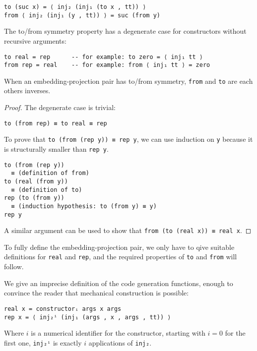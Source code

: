 \begin{verbatim}
to (suc x) = ⟨ inj₂ (inj₁ (to x , tt)) ⟩
from ⟨ inj₂ (inj₁ (y , tt)) ⟩ = suc (from y)
\end{verbatim}

The to/from symmetry property has a degenerate case for constructors
without recursive arguments:

\begin{verbatim}
to real = rep      -- for example: to zero = ⟨ inj₁ tt ⟩
from rep = real    -- for example: from ⟨ inj₁ tt ⟩ = zero
\end{verbatim}

\begin{theorem}
When an embedding-projection pair has to/from symmetry, \texttt{from}
and \texttt{to} are each others inverses.
\end{theorem}
\begin{proof}
The degenerate case is trivial:

\begin{verbatim}
to (from rep) ≡ to real ≡ rep
\end{verbatim}

To prove that \texttt{to (from (rep y)) ≡ rep y}, we can use induction
on \texttt{y} because it is structurally smaller than \texttt{rep y}.

\begin{verbatim} 
to (from (rep y))
  ≡ (definition of from)
to (real (from y))
  ≡ (definition of to)
rep (to (from y))
  ≡ (induction hypothesis: to (from y) ≡ y)
rep y
\end{verbatim}

A similar argument can be used to show that
\texttt{from (to (real x)) ≡ real x}.
\end{proof}

To fully define the embedding-projection pair, we only have to qive
suitable definitions for \texttt{real} and \texttt{rep}, and the
required properties of \texttt{to} and \texttt{from} will follow.

We give an imprecise definition of the code generation functions,
enough to convince the reader that mechanical construction is
possible:

\begin{verbatim}
real x = constructorᵢ args x args
rep x = ⟨ inj₂ⁱ (inj₁ (args , x , args , tt)) ⟩
\end{verbatim}

Where $i$ is a numerical identifier for the constructor, starting with
$i = 0$ for the first one, \texttt{inj₂ⁱ} is exactly $i$ applications
of \texttt{inj₂}.


